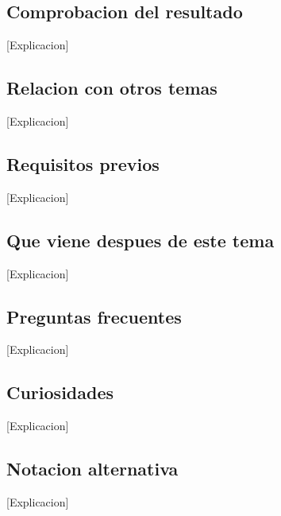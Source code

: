 \documentclass{article}
\begin{document}
\subsection*{Comprobacion del resultado}
[Explicacion]

\subsection*{Relacion con otros temas}
[Explicacion]

\subsection*{Requisitos previos}
[Explicacion]

\subsection*{Que viene despues de este tema}
[Explicacion]

\subsection*{Preguntas frecuentes}
[Explicacion]

\subsection*{Curiosidades}
[Explicacion]

\subsection*{Notacion alternativa}
[Explicacion]
\end{document}
